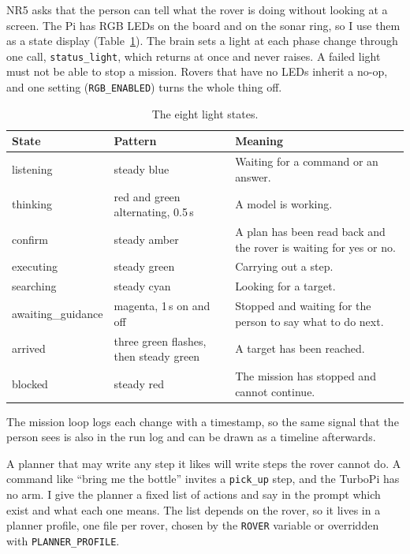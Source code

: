 \label{ssec:lights}

NR5 asks that the person can tell what the rover is doing without looking at a
screen. The Pi has RGB LEDs on the board and on the sonar ring, so I use them as
a state display (Table~\ref{tab:lights}). The brain sets a light at each phase
change through one call, \texttt{status\_light}, which returns at once and never
raises. A failed light must not be able to stop a mission. Rovers that have no
LEDs inherit a no-op, and one setting (\texttt{RGB\_ENABLED}) turns the whole
thing off.

\begin{table}[htbp]
  \centering
  \caption{The eight light states.}
  \label{tab:lights}
  \small
  \begin{tabular}{@{}l l p{6.6cm}@{}}
    \toprule
    State & Pattern & Meaning \\
    \midrule
    listening & steady blue & Waiting for a command or an answer. \\
    thinking & red and green alternating, 0.5\,s & A model is working. \\
    confirm & steady amber & A plan has been read back and the rover is waiting for yes or no. \\
    executing & steady green & Carrying out a step. \\
    searching & steady cyan & Looking for a target. \\
    awaiting\_guidance & magenta, 1\,s on and off & Stopped and waiting for the person to say what to do next. \\
    arrived & three green flashes, then steady green & A target has been reached. \\
    blocked & steady red & The mission has stopped and cannot continue. \\
    \bottomrule
  \end{tabular}
\end{table}

The mission loop logs each change with a timestamp, so the same signal that the
person sees is also in the run log and can be drawn as a timeline afterwards.

\label{sec:vocabulary}

A planner that may write any step it likes will write steps the rover cannot do.
A command like ``bring me the bottle'' invites a \texttt{pick\_up} step, and the
TurboPi has no arm. I give the planner a fixed list of actions and say in the
prompt which exist and what each one means. The
list depends on the rover, so it lives in a planner profile, one file per rover,
chosen by the \texttt{ROVER} variable or overridden with
\texttt{PLANNER\_PROFILE}.

